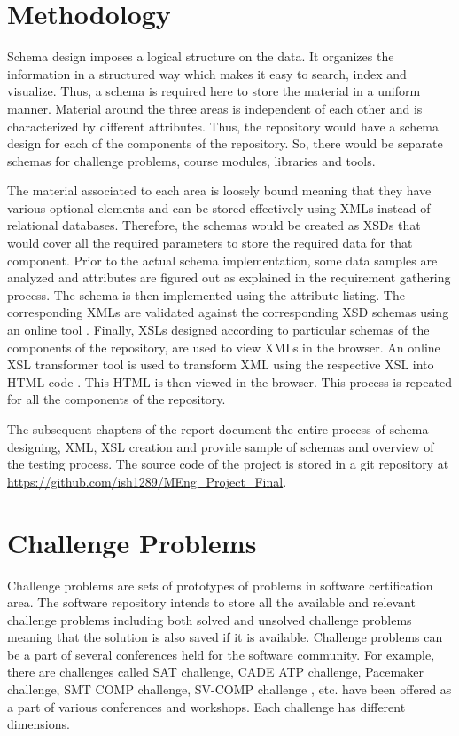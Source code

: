 \documentclass[11pt,letterpaper]{report}
\begin{document}
\chapter{Methodology} 
Schema design imposes a logical structure on the data. It organizes the information in a structured way which makes it easy to search, index and visualize. Thus, a schema is required here to store the material in a uniform manner. Material around the three areas is independent of each other and is characterized by different attributes. Thus, the repository would have a schema design for each of the components of the repository. So, there would be separate schemas for challenge problems, course modules, libraries and tools. 

The material associated to each area is loosely bound meaning that they have various optional elements and can be stored effectively using XMLs instead of relational databases. Therefore, the schemas would be created as XSDs that would cover all the required parameters to store the required data for that component. Prior to the actual schema implementation, some data samples are analyzed and attributes are figured out as explained in the requirement gathering process. The schema is then implemented using the attribute listing. The corresponding XMLs are validated against the corresponding XSD schemas using an online tool \cite{olXSD}. Finally, XSLs designed according to particular schemas of the components of the repository, are used to view XMLs in the browser. An online XSL transformer tool is used to transform XML using the respective XSL into HTML code \cite{olXSL}. This HTML is then viewed in the browser. This process is repeated for all the components of the repository. 

The subsequent chapters of the report document the entire process of schema designing, XML, XSL creation and provide sample of schemas and overview of the testing process. The source code of the project is stored in a git repository at \url{https://github.com/ish1289/MEng_Project_Final}.

\chapter{Challenge Problems}

Challenge problems are sets of prototypes of problems in software certification area. The software repository intends to store all the available and relevant challenge problems including both solved and unsolved challenge problems meaning that the solution is also saved if it is available. Challenge problems can be a part of several conferences held for the software community. For example, there are challenges called SAT challenge, CADE ATP  challenge, Pacemaker challenge, SMT COMP challenge, SV-COMP challenge \cite{SAT,CADE,Pacemaker,SMT,SV}, etc. have been offered as a part of various conferences and workshops. Each challenge has different dimensions. 
\end{document}
